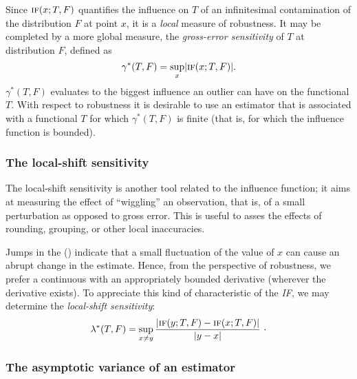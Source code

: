 Since $\stsc{IF}(x; T, F)$ quantifies the influence on $T$ of an infinitesimal
contamination of the distribution $F$ at point $x$, it is a \emph{local}
measure of robustness. It may be completed by a more global measure, the
\emph{gross-error sensitivity} of $T$ at distribution $F$, defined as
\[
    \gamma^*(T, F) = \sup_x \left| \stsc{IF}(x; T, F) \right|.
\]
$\gamma^*(T, F)$ evaluates to the biggest influence an outlier can have on
the functional $T$. With respect to robustness it is desirable to use an
estimator that is associated with a functional $T$ for which $\gamma^*(T, F)$ 
is finite (that is, for which the influence function is bounded).


\subsubsection{The local-shift sensitivity}

The local-shift sensitivity is another tool related to the influence function;
it aims at measuring the effect of “wiggling” an observation, that is, of a
small perturbation as opposed to gross error. This is useful to asses the
effects of rounding, grouping, or other local inaccuracies.

Jumps in the  () indicate that a small
fluctuation of the value of $x$ can cause an abrupt change in the estimate.
Hence, from the perspective of robustness, we prefer a continuous 
with an appropriately bounded derivative (wherever the derivative exists). 
To appreciate this kind of characteristic
of the \textit{IF}, we may determine the \emph{local-shift sensitivity}:
\[
    \lambda^*(T, F) = \sup_{x\neq y} \frac{|\stsc{IF}(y; T, F) - \stsc{IF}(x; T, F)|}
                                          {|y - x|}\ \cdot
\]


\subsubsection{The asymptotic variance of an estimator}

